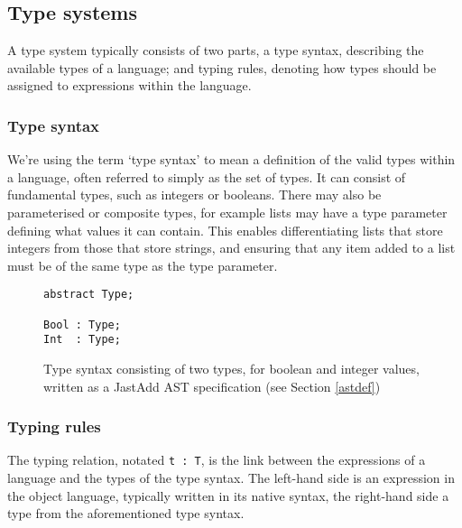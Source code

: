 \documentclass[nofilelist]{cslthse-msc}
\newcommand{\CR}[1]{\textcolor{green!60!black}{[\textbf{CR}:#1]}}
\newcommand{\reviewquestion}[1]{\textcolor{red!80!black}{[\textbf{Review question}:#1]}}
\begin{document}
\subsection{Type systems}
A type system typically consists of two parts, a type syntax, describing the available types of a language; and typing rules, denoting how types should be assigned to expressions within the language.

\subsubsection{Type syntax}\label{typesyntax}
We're using the term `type syntax' to mean a definition of the valid types within a language, often referred to simply as the set of types.
It can consist of fundamental types, such as integers or booleans.
There may also be parameterised or composite types, for example lists may have a type parameter defining what values it can contain.
This enables differentiating lists that store integers from those that store strings, and ensuring that any item added to a list must be of the same type as the type parameter.
\begin{figure}[h]
\begin{lstlisting}[]
abstract Type;

Bool : Type;
Int  : Type;
\end{lstlisting}
  \caption{Type syntax consisting of two types, for boolean and integer values, written as a JastAdd AST specification (see Section \ref{astdef})}
  \label{typesyntaxspec}
\end{figure}

\subsubsection{Typing rules}
The typing relation, notated \lstinline{t : T}, is the link between the expressions of a language and the types of the type syntax.
The left-hand side is an expression in the object language, typically written in its native syntax, the right-hand side a type from the aforementioned type syntax.
\end{document}
